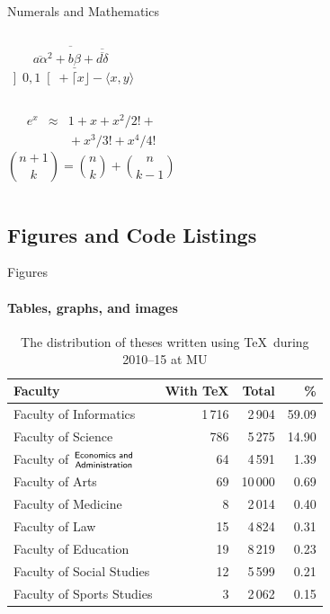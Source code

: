 \begin{darkframes}
\begin{frame}[label=math]{Numerals and Mathematics}
\begin{columns}[onlytextwidth]
          $$\overline{\overline{a\alpha}^2+\underline{b\beta}
           +\overline{\overline{d\delta}}}$$
          $\left] 0,1\right[ + \lceil x \rfloor - \langle x,y\rangle$
      \end{columns}
      \begin{columns}[onlytextwidth]
          \begin{eqnarray*}
           e^x &\approx& 1+x+x^2/2! + \\
             && {}+x^3/3! + x^4/4!
          \end{eqnarray*}
          $${n+1\choose k} = {n\choose k} + {n \choose k-1}$$
      \end{columns}
    \end{frame}

    \subsection{Figures and Code Listings}
    \begin{frame}[label=figs1]{Figures}
      \framesubtitle{Tables, graphs, and images}
      \begin{table}[!b]
        {\carlitoTLF %
        \begin{tabularx}{\textwidth}{Xrrr}
          \textbf{Faculty} & \textbf{With \TeX} & \textbf{Total} &
          \textbf{\%} \\
          \toprule
          Faculty of Informatics       & 1\,716  & 2\,904  &
          59.09 \\%
          Faculty of Science           & 786     & 5\,275  &
          14.90 \\%
          Faculty of $\genfrac{}{}{0pt}{}{\textsf{Economics and}}{%
          \textsf{Administration}}$    & 64      & 4\,591  &
          1.39  \\%
          Faculty of Arts              & 69      & 10\,000 &
          0.69  \\%
          Faculty of Medicine          & 8       & 2\,014  &
          0.40  \\%
          Faculty of Law               & 15      & 4\,824  &
          0.31  \\%
          Faculty of Education         & 19      & 8\,219  &
          0.23  \\%
          Faculty of Social Studies    & 12      & 5\,599  &
          0.21  \\%
          Faculty of Sports Studies    & 3       & 2\,062  &
          0.15  \\%
          \bottomrule
        \end{tabularx}}
        \caption{The distribution of theses written using \TeX\ during 2010--15 at MU}
      \end{table}
    \end{frame}


\end{darkframes}
